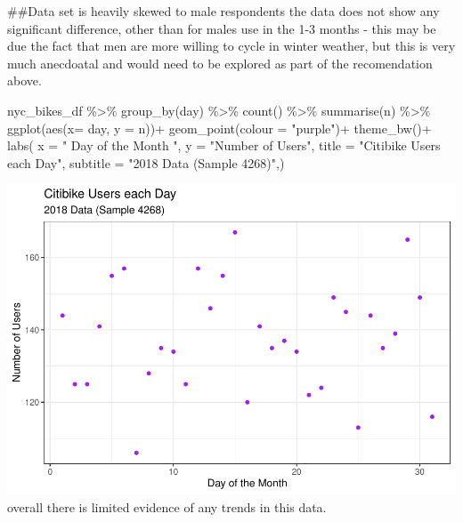 \documentclass[
]{article}
\newenvironment{Shaded}{\begin{snugshade}}{\end{snugshade}}
\newcommand{\AttributeTok}[1]{\textcolor[rgb]{0.77,0.63,0.00}{#1}}
\newcommand{\FunctionTok}[1]{\textcolor[rgb]{0.00,0.00,0.00}{#1}}
\newcommand{\NormalTok}[1]{#1}
\newcommand{\SpecialCharTok}[1]{\textcolor[rgb]{0.00,0.00,0.00}{#1}}
\newcommand{\StringTok}[1]{\textcolor[rgb]{0.31,0.60,0.02}{#1}}
\begin{document}
\#\#Data set is heavily skewed to male respondents the data does not
show any significant difference, other than for males use in the 1-3
months - this may be due the fact that men are more willing to cycle in
winter weather, but this is very much anecdoatal and would need to be
explored as part of the recomendation above.

\begin{Shaded}
\begin{Highlighting}[]
\NormalTok{nyc\_bikes\_df }\SpecialCharTok{\%\textgreater{}\%}
  \FunctionTok{group\_by}\NormalTok{(day) }\SpecialCharTok{\%\textgreater{}\%}
  \FunctionTok{count}\NormalTok{() }\SpecialCharTok{\%\textgreater{}\%}
  \FunctionTok{summarise}\NormalTok{(n) }\SpecialCharTok{\%\textgreater{}\%}
  \FunctionTok{ggplot}\NormalTok{(}\FunctionTok{aes}\NormalTok{(}\AttributeTok{x=}\NormalTok{ day, }\AttributeTok{y =}\NormalTok{ n))}\SpecialCharTok{+}
  \FunctionTok{geom\_point}\NormalTok{(}\AttributeTok{colour =} \StringTok{"purple"}\NormalTok{)}\SpecialCharTok{+}
  \FunctionTok{theme\_bw}\NormalTok{()}\SpecialCharTok{+}
  \FunctionTok{labs}\NormalTok{(}
    \AttributeTok{x =} \StringTok{" Day of the Month "}\NormalTok{,}
    \AttributeTok{y =} \StringTok{"Number of Users"}\NormalTok{,}
    \AttributeTok{title =} \StringTok{"Citibike Users each Day"}\NormalTok{,}
    \AttributeTok{subtitle =} \StringTok{"2018 Data (Sample 4268)"}\NormalTok{,)}
\end{Highlighting}
\end{Shaded}

\includegraphics{nyc_bikes_presentation_janehogg_files/figure-latex/unnamed-chunk-14-1.pdf}
overall there is limited evidence of any trends in this data.
\end{document}
